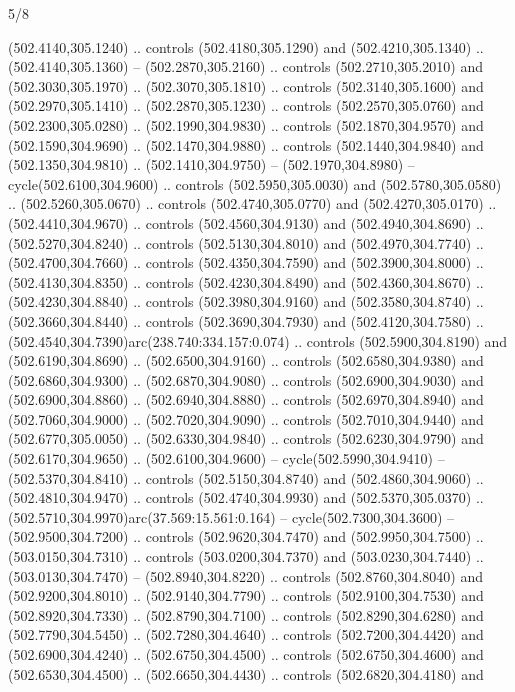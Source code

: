 \begin{flagdescription}{5/8}
\begin{scope}[xshift=0.5\flaglength,yshift=0.5\flagwidth,scale=\flagwidth/475.63]
\begin{scope}[y=0.8pt, x=0.8pt, yscale=-1, xscale=1,shift={(-450,-300)}]
\begin{scope}[cm={{1.0,0.0,0.0,1.0,(-0.0002,0.12556)}},cm={{1.0,0.0,0.0,1.0,(0.00179,0.0)}}]
\begin{scope}[cm={{1.11592,0.0,0.0,1.11592,(-106.89933,-41.77764)}}]
\begin{scope}[draw=black,fill=cfff]
\begin{scope}[fill=black]
  (502.4140,305.1240) .. controls (502.4180,305.1290) and (502.4210,305.1340) ..
  (502.4140,305.1360) -- (502.2870,305.2160) .. controls (502.2710,305.2010) and
  (502.3030,305.1970) .. (502.3070,305.1810) .. controls (502.3140,305.1600) and
  (502.2970,305.1410) .. (502.2870,305.1230) .. controls (502.2570,305.0760) and
  (502.2300,305.0280) .. (502.1990,304.9830) .. controls (502.1870,304.9570) and
  (502.1590,304.9690) .. (502.1470,304.9880) .. controls (502.1440,304.9840) and
  (502.1350,304.9810) .. (502.1410,304.9750) -- (502.1970,304.8980) --
  cycle(502.6100,304.9600) .. controls (502.5950,305.0030) and
  (502.5780,305.0580) .. (502.5260,305.0670) .. controls (502.4740,305.0770) and
  (502.4270,305.0170) .. (502.4410,304.9670) .. controls (502.4560,304.9130) and
  (502.4940,304.8690) .. (502.5270,304.8240) .. controls (502.5130,304.8010) and
  (502.4970,304.7740) .. (502.4700,304.7660) .. controls (502.4350,304.7590) and
  (502.3900,304.8000) .. (502.4130,304.8350) .. controls (502.4230,304.8490) and
  (502.4360,304.8670) .. (502.4230,304.8840) .. controls (502.3980,304.9160) and
  (502.3580,304.8740) .. (502.3660,304.8440) .. controls (502.3690,304.7930) and
  (502.4120,304.7580) .. (502.4540,304.7390)arc(238.740:334.157:0.074) ..
  controls (502.5900,304.8190) and (502.6190,304.8690) .. (502.6500,304.9160) ..
  controls (502.6580,304.9380) and (502.6860,304.9300) .. (502.6870,304.9080) ..
  controls (502.6900,304.9030) and (502.6900,304.8860) .. (502.6940,304.8880) ..
  controls (502.6970,304.8940) and (502.7060,304.9000) .. (502.7020,304.9090) ..
  controls (502.7010,304.9440) and (502.6770,305.0050) .. (502.6330,304.9840) ..
  controls (502.6230,304.9790) and (502.6170,304.9650) .. (502.6100,304.9600) --
  cycle(502.5990,304.9410) -- (502.5370,304.8410) .. controls
  (502.5150,304.8740) and (502.4860,304.9060) .. (502.4810,304.9470) .. controls
  (502.4740,304.9930) and (502.5370,305.0370) ..
  (502.5710,304.9970)arc(37.569:15.561:0.164) -- cycle(502.7300,304.3600) --
  (502.9500,304.7200) .. controls (502.9620,304.7470) and (502.9950,304.7500) ..
  (503.0150,304.7310) .. controls (503.0200,304.7370) and (503.0230,304.7440) ..
  (503.0130,304.7470) -- (502.8940,304.8220) .. controls (502.8760,304.8040) and
  (502.9200,304.8010) .. (502.9140,304.7790) .. controls (502.9100,304.7530) and
  (502.8920,304.7330) .. (502.8790,304.7100) .. controls (502.8290,304.6280) and
  (502.7790,304.5450) .. (502.7280,304.4640) .. controls (502.7200,304.4420) and
  (502.6900,304.4240) .. (502.6750,304.4500) .. controls (502.6750,304.4600) and
  (502.6530,304.4500) .. (502.6650,304.4430) .. controls (502.6820,304.4180) and

\end{scope}
\end{scope}
\end{scope}
\end{scope}
\end{scope}
\end{scope}
\end{flagdescription}
